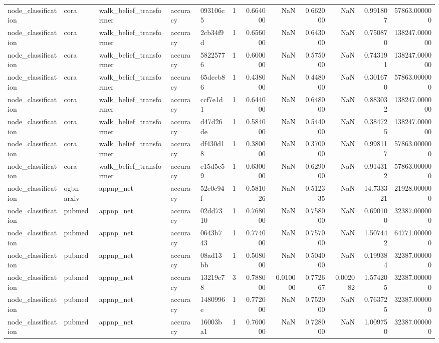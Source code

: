 \begin{tabular}{lllllrrrrrrr}
node_classification & cora & walk_belief_transformer & accuracy & 093106c5 & 1 & 0.664000 & NaN & 0.662000 & NaN & 0.991807 & 57863.000000 \\
node_classification & cora & walk_belief_transformer & accuracy & 2cb34f9d & 1 & 0.656000 & NaN & 0.643000 & NaN & 0.750870 & 138247.000000 \\
node_classification & cora & walk_belief_transformer & accuracy & 58225776 & 1 & 0.600000 & NaN & 0.575000 & NaN & 0.743191 & 138247.000000 \\
node_classification & cora & walk_belief_transformer & accuracy & 65dccb86 & 1 & 0.438000 & NaN & 0.448000 & NaN & 0.301670 & 57863.000000 \\
node_classification & cora & walk_belief_transformer & accuracy & ccf7e1d1 & 1 & 0.644000 & NaN & 0.648000 & NaN & 0.883032 & 138247.000000 \\
node_classification & cora & walk_belief_transformer & accuracy & d47d26de & 1 & 0.584000 & NaN & 0.544000 & NaN & 0.384725 & 138247.000000 \\
node_classification & cora & walk_belief_transformer & accuracy & df430d18 & 1 & 0.380000 & NaN & 0.370000 & NaN & 0.998117 & 57863.000000 \\
node_classification & cora & walk_belief_transformer & accuracy & e15d5c59 & 1 & 0.630000 & NaN & 0.629000 & NaN & 0.914312 & 57863.000000 \\
node_classification & ogbn-arxiv & appnp_net & accuracy & 52e0c94f & 1 & 0.581026 & NaN & 0.512335 & NaN & 14.733321 & 21928.000000 \\
node_classification & pubmed & appnp_net & accuracy & 02dd7310 & 1 & 0.768000 & NaN & 0.758000 & NaN & 0.690100 & 32387.000000 \\
node_classification & pubmed & appnp_net & accuracy & 0643b743 & 1 & 0.774000 & NaN & 0.757000 & NaN & 1.507442 & 64771.000000 \\
node_classification & pubmed & appnp_net & accuracy & 08ad13bb & 1 & 0.508000 & NaN & 0.504000 & NaN & 0.199384 & 32387.000000 \\
node_classification & pubmed & appnp_net & accuracy & 13219c78 & 3 & 0.788000 & 0.010000 & 0.772667 & 0.002082 & 1.574205 & 32387.000000 \\
node_classification & pubmed & appnp_net & accuracy & 1480996e & 1 & 0.772000 & NaN & 0.752000 & NaN & 0.763725 & 32387.000000 \\
node_classification & pubmed & appnp_net & accuracy & 16003ba1 & 1 & 0.760000 & NaN & 0.728000 & NaN & 1.009750 & 32387.000000 \\

\end{tabular}
